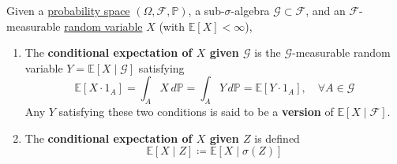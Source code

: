   \begin{definition}
    \label{def:cond-exp}
    Given a \hyperref[def:probability-space]{probability space} $(\Omega, \mathcal{F}, \mathbb{P})$, a sub-$\sigma$-algebra $\mathcal{G} \subset \mathcal{F}$, and an $\mathcal{F}$-measurable \hyperref[def:random-variable]{random variable} $X$ (with $\mathbb{E}[X] < \infty$), 
		\begin{enumerate}
		  \item The \textbf{conditional expectation of $X$ given $\mathcal{G}$} is the $\mathcal{G}$-measurable random variable $Y = \mathbb{E}[X \mid \mathcal{G}]$ satisfying 
				\begin{equation}
					\mathbb{E}[X \cdot 1_A] = \int_A X \,d\mathbb{P} = \int_A Y \,d \mathbb{P} = \mathbb{E}[Y \cdot 1_A], \quad \forall A \in \mathcal{G}
				\end{equation}
				Any $Y$ satisfying these two conditions is said to be a \textbf{version} of $\mathbb{E}[X \mid \mathcal{F}]$. 

			\item The \textbf{conditional expectation of $X$ given $Z$} is defined 
				\begin{equation}
					\mathbb{E}[X \mid Z] \coloneqq \mathbb{E}[X \mid \sigma(Z)]
				\end{equation}
		\end{enumerate}
  \end{definition}
